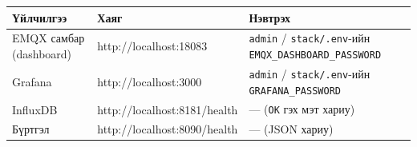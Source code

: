 \begingroup\scriptsize\begin{longtable}[]{@{}lll@{}}
\toprule
\begin{minipage}[b]{0.30\columnwidth}\raggedright
Үйлчилгээ\strut
\end{minipage} & \begin{minipage}[b]{0.30\columnwidth}\raggedright
Хаяг\strut
\end{minipage} & \begin{minipage}[b]{0.30\columnwidth}\raggedright
Нэвтрэх\strut
\end{minipage}\tabularnewline
\midrule
\endhead
\begin{minipage}[t]{0.30\columnwidth}\raggedright
EMQX самбар (dashboard)\strut
\end{minipage} & \begin{minipage}[t]{0.30\columnwidth}\raggedright
http://localhost:18083\strut
\end{minipage} & \begin{minipage}[t]{0.30\columnwidth}\raggedright
\texttt{admin} / \texttt{stack/.env}-ийн \texttt{EMQX\_\allowbreak{}DASHBOARD\_\allowbreak{}PASSWORD}\strut
\end{minipage}\tabularnewline
\begin{minipage}[t]{0.30\columnwidth}\raggedright
Grafana\strut
\end{minipage} & \begin{minipage}[t]{0.30\columnwidth}\raggedright
http://localhost:3000\strut
\end{minipage} & \begin{minipage}[t]{0.30\columnwidth}\raggedright
\texttt{admin} / \texttt{stack/.env}-ийн \texttt{GRAFANA\_\allowbreak{}PASSWORD}\strut
\end{minipage}\tabularnewline
\begin{minipage}[t]{0.30\columnwidth}\raggedright
InfluxDB\strut
\end{minipage} & \begin{minipage}[t]{0.30\columnwidth}\raggedright
http://localhost:8181/health\strut
\end{minipage} & \begin{minipage}[t]{0.30\columnwidth}\raggedright
--- (\texttt{OK} гэх мэт хариу)\strut
\end{minipage}\tabularnewline
\begin{minipage}[t]{0.30\columnwidth}\raggedright
Бүртгэл\strut
\end{minipage} & \begin{minipage}[t]{0.30\columnwidth}\raggedright
http://localhost:8090/health\strut
\end{minipage} & \begin{minipage}[t]{0.30\columnwidth}\raggedright
--- (JSON хариу)\strut
\end{minipage}\tabularnewline
\bottomrule
\end{longtable}\endgroup

